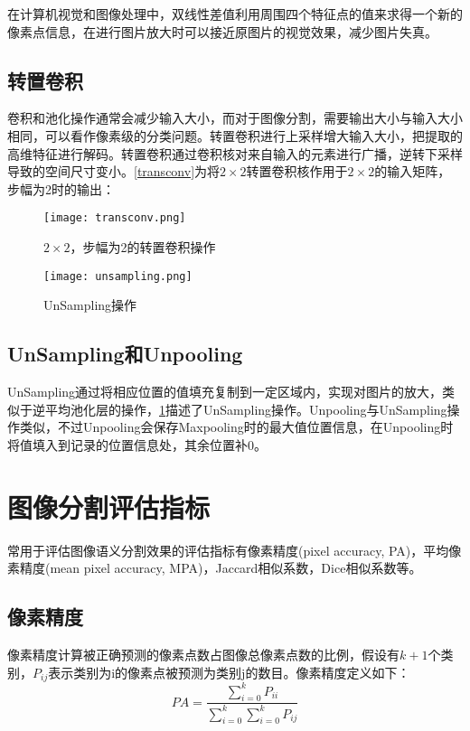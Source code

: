 \documentclass[AutoFakeBold]{LZUThesis}
\begin{document}
在计算机视觉和图像处理中，双线性差值利用周围四个特征点的值来求得一个新的像素点信息，在进行图片放大时可以接近原图片的视觉效果，减少图片失真。



\subsection{转置卷积}
卷积和池化操作通常会减少输入大小，而对于图像分割，需要输出大小与输入大小相同，可以看作像素级的分类问题。转置卷积进行上采样增大输入大小，把提取的高维特征进行解码。转置卷积通过卷积核对来自输入的元素进行广播，逆转下采样导致的空间尺寸变小。\cref{transconv}为将$2\times 2$转置卷积核作用于$2\times 2$的输入矩阵，步幅为2时的输出：
\begin{figure}[htbp]
    \begin{minipage}[t]{0.5\linewidth}  %
        \centering
        \texttt{[image: transconv.png]}
        \caption{$2\times 2$，步幅为2的转置卷积操作}
        \label{transconv}
    \end{minipage}
    \hfill%
    \begin{minipage}[t]{0.5\linewidth}
        \centering
        \texttt{[image: unsampling.png]}
        \caption{UnSampling操作}
        \label{unsampling}
    \end{minipage}
\end{figure}

\subsection{UnSampling和Unpooling}
UnSampling通过将相应位置的值填充复制到一定区域内，实现对图片的放大，类似于逆平均池化层的操作，\cref{unsampling}描述了UnSampling操作。Unpooling与UnSampling操作类似，不过Unpooling会保存Maxpooling时的最大值位置信息，在Unpooling时将值填入到记录的位置信息处，其余位置补0。




\section{图像分割评估指标}
常用于评估图像语义分割效果的评估指标有像素精度(pixel accuracy, PA)，平均像素精度(mean pixel accuracy, MPA)，Jaccard相似系数，Dice相似系数等。
\subsection{像素精度}
像素精度计算被正确预测的像素点数占图像总像素点数的比例，假设有$k+1$个类别，$P_{ij}$表示类别为i的像素点被预测为类别j的数目。像素精度定义如下：
\begin{equation}
    PA=\frac{\sum\limits_{i=0}^{k}P_{ii}}{\sum\limits_{i=0}^{k}\sum\limits_{i=0}^{k}P_{ij}}
\end{equation}
\end{document}
